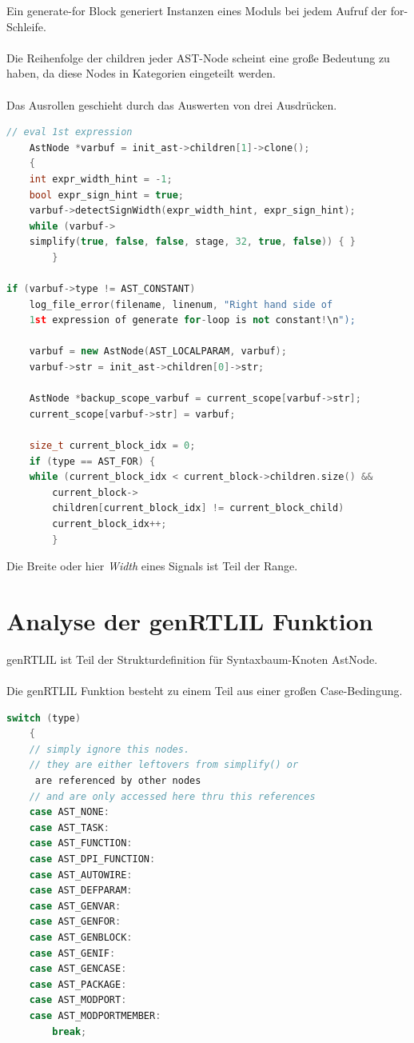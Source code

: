 \documentclass[11pt]{report}
\begin{document}
Ein generate-for Block generiert Instanzen eines Moduls bei jedem Aufruf der for-Schleife.\\
\\
Die Reihenfolge der children jeder AST-Node scheint eine große Bedeutung zu haben, da diese Nodes in Kategorien eingeteilt werden.
\\
\\
Das Ausrollen geschieht durch das Auswerten von drei Ausdrücken.
\begin{lstlisting}[language=C++]
	// eval 1st expression
	AstNode *varbuf = init_ast->children[1]->clone();
	{
	int expr_width_hint = -1;
	bool expr_sign_hint = true;
	varbuf->detectSignWidth(expr_width_hint, expr_sign_hint);
	while (varbuf->
	simplify(true, false, false, stage, 32, true, false)) { }
		}

if (varbuf->type != AST_CONSTANT)
	log_file_error(filename, linenum, "Right hand side of 
	1st expression of generate for-loop is not constant!\n");

	varbuf = new AstNode(AST_LOCALPARAM, varbuf);
	varbuf->str = init_ast->children[0]->str;

	AstNode *backup_scope_varbuf = current_scope[varbuf->str];
	current_scope[varbuf->str] = varbuf;

	size_t current_block_idx = 0;
	if (type == AST_FOR) {
	while (current_block_idx < current_block->children.size() &&
		current_block->
		children[current_block_idx] != current_block_child)
		current_block_idx++;
		}
\end{lstlisting}

Die Breite oder hier \textit{Width} eines Signals ist Teil der Range.



\section{Analyse der genRTLIL Funktion}

genRTLIL ist Teil der Strukturdefinition für Syntaxbaum-Knoten AstNode. 
\\
\\
Die genRTLIL Funktion besteht zu einem Teil aus einer großen Case-Bedingung.

\begin{lstlisting}[language=C++]
	switch (type)
	{
	// simply ignore this nodes.
	// they are either leftovers from simplify() or
	 are referenced by other nodes
	// and are only accessed here thru this references
	case AST_NONE:
	case AST_TASK:
	case AST_FUNCTION:
	case AST_DPI_FUNCTION:
	case AST_AUTOWIRE:
	case AST_DEFPARAM:
	case AST_GENVAR:
	case AST_GENFOR:
	case AST_GENBLOCK:
	case AST_GENIF:
	case AST_GENCASE:
	case AST_PACKAGE:
	case AST_MODPORT:
	case AST_MODPORTMEMBER:
		break;
\end{lstlisting}
\end{document}
